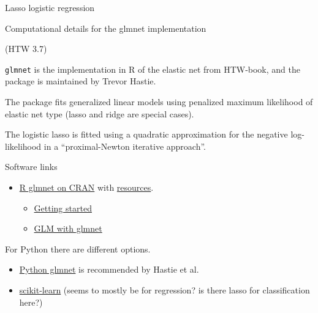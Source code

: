 \documentclass[
  ignorenonframetext,
]{beamer}
\providecommand{\tightlist}{%
  \setlength{\itemsep}{0pt}\setlength{\parskip}{0pt}}
\begin{document}
\begin{frame}[fragile]
\begin{block}{Lasso logistic regression}
\end{block}

\end{frame}

\begin{frame}[fragile]{Computational details for the glmnet
implementation}
\protect\hypertarget{computational-details-for-the-glmnet-implementation}{}

(HTW 3.7)

\texttt{glmnet} is the implementation in R of the elastic net from
HTW-book, and the package is maintained by Trevor Hastie.

The package fits generalized linear models using penalized maximum
likelihood of elastic net type (lasso and ridge are special cases).

The logistic lasso is fitted using a quadratic approximation for the
negative log-likelihood in a ``proximal-Newton iterative approach''.

\begin{block}{Software links}

\begin{itemize}
\tightlist
\item
  \href{https://cran.r-project.org/web/packages/glmnet/index.html}{R
  glmnet on CRAN} with
  \href{http://www.stanford.edu/~hastie/glmnet}{resources}.

  \begin{itemize}
  \tightlist
  \item
    \href{https://glmnet.stanford.edu/articles/glmnet.html}{Getting
    started}
  \item
    \href{https://glmnet.stanford.edu/articles/glmnetFamily.html}{GLM
    with glmnet}
  \end{itemize}
\end{itemize}

For Python there are different options.

\begin{itemize}
\tightlist
\item
  \href{https://web.stanford.edu/~hastie/glmnet_python/}{Python glmnet}
  is recommended by Hastie et al.
\item
  \href{https://scikit-learn.org/stable/modules/linear_model.html\#ridge-regression-and-classification}{scikit-learn}
  (seems to mostly be for regression? is there lasso for classification
  here?)
\end{itemize}

\end{block}

\end{frame}
\end{document}
